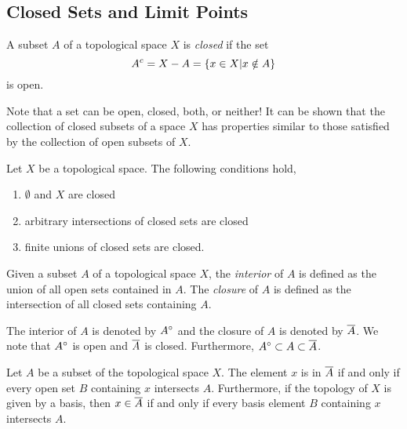 \subsection{Closed Sets and Limit Points}

\begin{definition}
A subset $A$ of a topological space $X$ is \emph{closed} if the set
\begin{equation*}
{A}^{c} = X - A = \{ x \in X | x \notin A \}
\end{equation*}
is open.
\end{definition}

Note that a set can be open, closed, both, or neither!
It can be shown that the collection of closed subsets of a space $X$ has properties similar to those satisfied by the collection of open subsets of $X$.

\begin{fact}
Let $X$ be a topological space.
The following conditions hold,
\begin{enumerate}
\item $\emptyset$ and $X$ are closed
\item arbitrary intersections of closed sets are closed
\item finite unions of closed sets are closed.
\end{enumerate}
\end{fact}

\begin{definition}
Given a subset $A$ of a topological space $X$, the \emph{interior} of $A$ is defined as the union of all open sets contained in $A$.
The \emph{closure} of $A$ is defined as the intersection of all closed sets containing $A$.
\end{definition}

The interior of $A$ is denoted by ${A}^{\circ}$ and the closure of $A$ is denoted by $\overline{A}$.
We note that ${A}^{\circ}$ is open and $\overline{A}$ is closed.
Furthermore, ${A}^{\circ} \subset A \subset \overline{A}$.

\begin{theorem} \label{theorem:ClosureConditions}
Let $A$ be a subset of the topological space $X$.
The element $x$ is in $\overline{A}$ if and only if every open set $B$ containing $x$ intersects $A$.
Furthermore, if the topology of $X$ is given by a basis, then $x \in \overline{A}$ if and only if every basis element $B$ containing $x$ intersects $A$.
\end{theorem}

